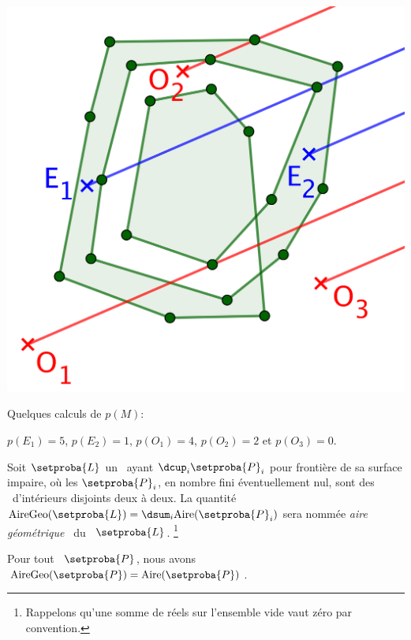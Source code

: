 \begin{center}
	\small\itshape
	\includegraphics[scale=.3]{content/polygon/geo-area/geo-area-odd-even.png}
	
	
	Quelques calculs de $p(M)$:

	\smallskip
	
	$p(E_1) = 5$,
	$p(E_2) = 1$,
%	
%	
	$p(O_1) = 4$,
	$p(O_2) = 2$ et
	$p(O_3) = 0$.
\end{center}


\begin{defi} \label{garea-def}
    Soit
    $\setproba{L}$ un \ncycle\
    ayant $\dcup_{i} \setproba{P}_i$ pour frontière de sa surface impaire, où les $\setproba{P}_i$, en nombre fini éventuellement nul, sont des \ngones\ d'intérieurs disjoints deux à deux.
    La quantité $\geoarea{\setproba{L}} = \dsum_{i} \area{\setproba{P}_i}$ sera nommée \og \emph{aire géométrique} \fg\ du \ncycle\ $\setproba{L}$.%
    \footnote{
    	Rappelons qu'une somme de réels sur l'ensemble vide vaut zéro par convention.
    }
\end{defi}




\begin{fact}
    Pour tout \ngone\ $\setproba{P}$, nous avons
	$\geoarea{\setproba{P}} = \area{\setproba{P}}$.
\end{fact}


